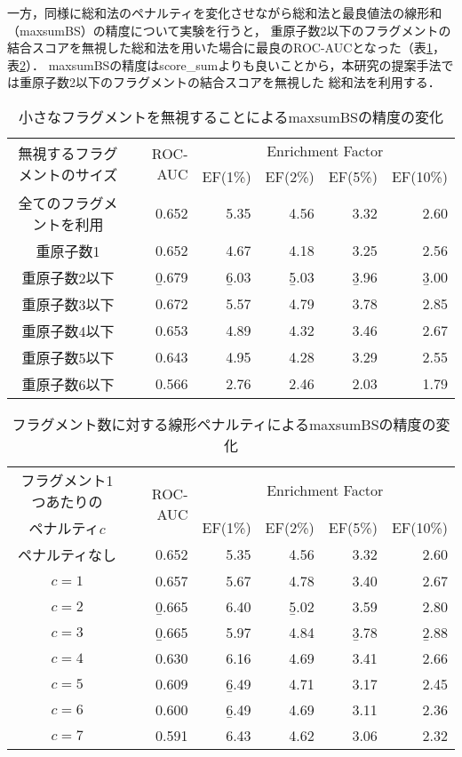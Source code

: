\newpage

一方，同様に総和法のペナルティを変化させながら総和法と最良値法の線形和（maxsumBS）の精度について実験を行うと，
重原子数2以下のフラグメントの結合スコアを無視した総和法を用いた場合に最良のROC-AUCとなった（表\ref{table:omit_maxsumBS}，
表\ref{table:penalty_maxsumBS}）．
maxsumBSの精度はscore\_sumよりも良いことから，本研究の提案手法では重原子数2以下のフラグメントの結合スコアを無視した
総和法を利用する．
\begin{table}[hb] \centering
	\caption{小さなフラグメントを無視することによるmaxsumBSの精度の変化}
	\label{table:omit_maxsumBS}
	\begin{tabular}{c|rrrrr}
	\hline
	\multirow{2}{*}{無視するフラグメントのサイズ}	&\multirow{2}{*}{ROC-AUC}	&\multicolumn{4}{c}{Enrichment Factor}				\\
										&						&EF(1\%)		&EF(2\%)		&EF(5\%)		&EF(10\%)	\\ \hline
	全てのフラグメントを利用					&0.652					&5.35		&4.56		&3.32		&2.60		\\
	重原子数1							&0.652					&4.67		&4.18		&3.25		&2.56		\\
	重原子数2以下						&\b{0.679}				&\b{6.03}		&\b{5.03}		&\b{3.96}		&\b{3.00}		\\
	重原子数3以下						&0.672					&5.57		&4.79		&3.78		&2.85		\\
	重原子数4以下						&0.653					&4.89		&4.32		&3.46		&2.67		\\
	重原子数5以下						&0.643					&4.95		&4.28		&3.29		&2.55		\\
	重原子数6以下						&0.566					&2.76		&2.46		&2.03		&1.79		\\ \hline
	\end{tabular}
\end{table}
\begin{table}[hb] \centering
	\caption{フラグメント数に対する線形ペナルティによるmaxsumBSの精度の変化}
	\label{table:penalty_maxsumBS}
	\begin{tabular}{c|rrrrr}
	\hline
	フラグメント1つあたりの	&\multirow{2}{*}{ROC-AUC}	&\multicolumn{4}{c}{Enrichment Factor}				\\
	ペナルティ$c$			&						&EF(1\%)		&EF(2\%)		&EF(5\%)		&EF(10\%)	\\ \hline
	ペナルティなし			&0.652					&5.35		&4.56		&3.32		&2.60		\\
	$c=1$				&0.657					&5.67		&4.78		&3.40		&2.67		\\
	$c=2$				&\b{0.665}				&6.40		&\b{5.02}		&3.59		&2.80		\\
	$c=3$				&\b{0.665}				&5.97		&4.84		&\b{3.78}		&\b{2.88}		\\
	$c=4$				&0.630					&6.16		&4.69		&3.41		&2.66		\\
	$c=5$				&0.609					&\b{6.49}		&4.71		&3.17		&2.45		\\
	$c=6$				&0.600					&\b{6.49}		&4.69		&3.11		&2.36		\\
	$c=7$				&0.591					&6.43		&4.62		&3.06		&2.32		\\ \hline
	\end{tabular}
\end{table}


